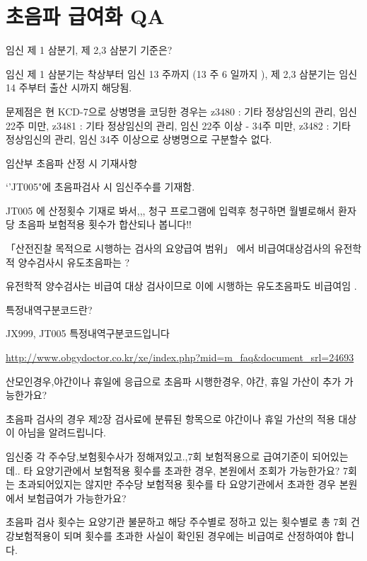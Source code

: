 \section{초음파 급여화 \textsf{QA}}
\textsf{임신 제 1 삼분기, 제 2,3 삼분기 기준은?}
\begin{commentbox}{}
임신 제 1 삼분기는 착상부터 임신 13 주까지 (13 주 6 일까지 ), 제 2,3 삼분기는 임신 14 주부터 출산 시까지 해당됨. \par \noindent
\textsf{문제점은 현 KCD-7으로 상병명을 코딩한 경우}는 z3480 : 기타 정상임신의 관리, 임신 22주 미만, z3481 : 기타 정상임신의 관리, 임신 22주 이상 - 34주 미만, z3482 : 기타 정상임신의 관리, 임신 34주 이상으로 상병명으로 구분할수 없다.
\end{commentbox}

\textsf{임산부 초음파 산정 시 기재사항}
\begin{commentbox}{}
`'JT005"에 초음파검사 시 임신주수를 기재함.\par \noindent JT005 에 산정횟수 기재로 봐서,,, 청구 프로그램에 입력후 청구하면 월별로해서 환자당 초음파 보험적용 횟수가 합산되나 봅니다!!
\end{commentbox}

\textsf{「산전진찰 목적으로 시행하는 검사의 요양급여 범위」 에서 비급여대상검사의 유전학적 양수검사시 유도초음파는 ?}
\begin{commentbox}{}
유전학적 양수검사는 비급여 대상 검사이므로 이에 시행하는 유도초음파도 비급여임 .
\end{commentbox}

\textsf{특정내역구분코드란?}
\begin{commentbox}{}
JX999, JT005 특정내역구분코드입니다\par\noindent\url{http://www.obgydoctor.co.kr/xe/index.php?mid=m_faq&document_srl=24693}
\end{commentbox}

\textsf{산모인경우,야간이나 휴일에 응급으로 초음파 시행한경우, 야간, 휴일 가산이 추가 가능한가요?}
\begin{commentbox}{}
초음파 검사의 경우 제2장 검사료에 분류된 항목으로 야간이나 휴일 가산의 적용 대상이 아님을 알려드립니다.
\end{commentbox}

\textsf{임신중 각 주수당,보험횟수사가 정해져있고.,7회 보험적용으로 급여기준이 되어있는데.. 타 요양기관에서 보험적용 횟수를 초과한 경우, 본원에서 조회가 가능한가요? 
7회는 초과되어있지는 않지만 주수당 보험적용 횟수를 타 요양기관에서 초과한 경우 본원에서 보험급여가 가능한가요?}
\begin{commentbox}{}
초음파 검사 횟수는 요양기관 불문하고 해당 주수별로 정하고 있는 횟수별로 총 7회 건강보험적용이 되며 횟수를 초과한 사실이 확인된 경우에는 비급여로 산정하여야 합니다.
\end{commentbox}

